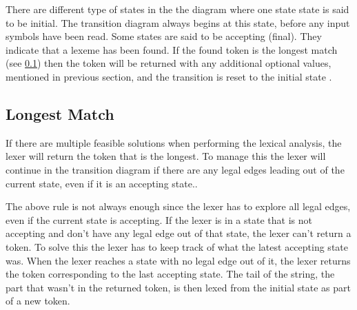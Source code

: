 There are different type of states in the the diagram where one state state is said to be initial. The transition diagram always begins at this state, before any input symbols have been read. Some states are said to be accepting (final). They indicate that a lexeme has been found. If the found token is the longest match (see \cref{sub:longmatch}) then the token will be returned with any additional optional values, mentioned in previous section, and the transition is reset to the initial state \cite{Aho2006}.

\subsection{Longest Match}\label{sub:longmatch}
If there are multiple feasible solutions when performing the lexical
analysis, the lexer will return the token that is the longest. To manage this
the lexer will continue in the transition diagram if there are any legal edges
leading out of the current state, even if it is an accepting state.\cite{Aho2006}.

The above rule is not always enough since the lexer has to explore all legal
edges, even if the current state is accepting. If the lexer is in a state that
is not accepting and don't have any legal edge out of that state, the lexer
can't return a token. To solve this the lexer has to keep track of what the
latest accepting state was. When the lexer reaches a state with no
legal edge out of it, the lexer returns the token corresponding to the last
accepting state. The tail of the string, the part that wasn't in the returned
token, is then lexed from the initial state as part of a new token.\cite{Aho2006}

